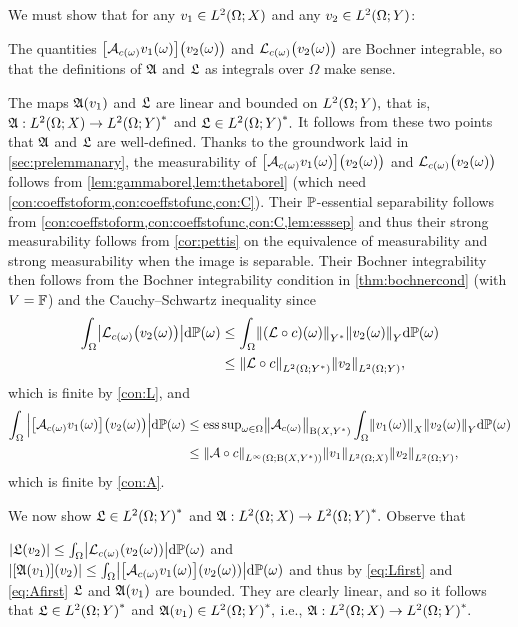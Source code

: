 We must show that for any $\vo \in \LtOX$ and any $\vt \in \LtOY$:
\bit
\item The quantities $\big[\Acomega \vo(\omega)\big]\big(\vt(\omega)\big)$ and $\Lcomega\big(\vt(\omega)\big)$ are Bochner integrable, so that the definitions of $\mathfrak{A}$ and $\mathfrak{L}$ as integrals over $\Omega$ make sense.
\item The maps $\mathfrak{A}(v_{1})$ and $\mathfrak{L}$ are linear and bounded on $\LtOY,$ that is, $\SA:\LtOX\rightarrow\LtOYas$ and $\SL \in \LtOYas.$
\eit
It follows from these two points that $\mathfrak{A}$ and $\mathfrak{L}$ are well-defined.
Thanks to the groundwork laid in \cref{sec:prelemmanary}, the measurability of $\big[\Acomega \vo(\omega)\big]\big(\vt(\omega)\big)$ and $\Lcomega\big(\vt(\omega)\big)$  follows from \cref{lem:gammaborel,lem:thetaborel} (which need \cref{con:coeffstoform,con:coeffstofunc,con:C}).
Their $\mathbb P$-essential separability follows from \cref{con:coeffstoform,con:coeffstofunc,con:C,lem:esssep} and thus their strong measurability follows from \cref{cor:pettis} on the equivalence of measurability and strong measurability when the image is separable. Their Bochner integrability then follows from the Bochner integrability condition in \cref{thm:bochnercond} (with $V=\mathbb F$) and the Cauchy--Schwartz inequality since
\begin{align}
\int_\Omega \abs{\Lcomega\big(\vt(\omega)\big)}\dd\PP(\omega)&\leq \int_\Omega \NYs{\mleft(\rhs\circ\coeff\mright)(\omega)}\NY{\vt(\omega)}\dd\PP(\omega)\nonumber\\
&\leq \NLtOYs{\rhs\circ\coeff}\NLtOY{\vt},\label{eq:Lfirst}
\end{align}
which is finite by \cref{con:L}, and 
\begin{align}
\int_\Omega \Big|\big[\Acomega \vo(\omega)\big]\big(\vt(\omega)\big)\Big|\dd\PP(\omega) %
&\leq \esssup_{\omega \in \Omega} \Nhomspace{\Acomega} \int_\Omega \NX{\vo(\omega)}\NY{\vt(\omega)}\dd\PP(\omega)\nonumber\\
&\leq \NLiOhomspace{\toform\circ\coeff}\NLtOX{\vo}\NLtOY{\vt},\label{eq:Afirst}
\end{align}
which is finite by \cref{con:A}.

We now show $\SL\in  \LtOYas$ and $\SA:\LtOX \rightarrow \LtOYas.$ Observe that 

\noindent $\abs{\SL(\vt)} \leq \int_\Omega \abs{\Lcomega\mleft(\vt(\omega)\mright)}\dd\PP(\omega)$ and $\abs{\mleft[\SA \mleft(\vo\mright)\mright](\vt)} \leq \int_\Omega \abs{\mleft[\Acomega \vo(\omega)\mright]\mleft(\vt(\omega)\mright)}\dd\PP(\omega)$ and thus by \eqref{eq:Lfirst} and \eqref{eq:Afirst} $\mathfrak{L}$ and $\mathfrak{A}(v_{1})$ are bounded. They are clearly linear, and so it follows that $\SL \in \LtOYas$ and $\SA(\vo)\in \LtOYas,$ i.e., $\SA:\LtOX \rightarrow \LtOYas.$
\epf

